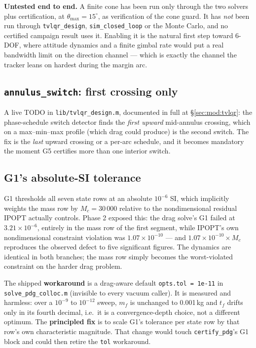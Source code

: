\documentclass[11pt]{article}
\newcommand{\file}[1]{\texttt{#1}}
\begin{document}
\textbf{Untested end to end.} A finite cone has been run only through the
two solvers plus certification, at $\theta_{\max}=15^\circ$, as verification
of the cone guard. It has \emph{not} been run through
\texttt{tvlqr\_design}, \texttt{sim\_closed\_loop} or the Monte Carlo, and
no certified campaign result uses it. Enabling it is the natural first step
toward 6-DOF, where attitude dynamics and a finite gimbal rate would put a
real bandwidth limit on the direction channel --- which is exactly the
channel the tracker leans on hardest during the margin arc.

\subsection{\texttt{annulus\_switch}: first crossing only}

A live TODO in \file{lib/tvlqr\_design.m}, documented in full at
\S\ref{sec:mod:tvlqr}: the phase-schedule switch detector finds the
\emph{first upward} mid-annulus crossing, which on a max--min--max profile
(which drag could produce) is the second switch. The fix is the \emph{last}
upward crossing or a per-arc schedule, and it becomes mandatory the moment
G5 certifies more than one interior switch.

\subsection{G1's absolute-SI tolerance}
\label{sec:extend:g1tol}

G1 thresholds all seven state rows at an absolute $10^{-6}$ SI, which
implicitly weights the mass row by $M_c = 30\,000$ relative to the
nondimensional residual IPOPT actually controls. Phase 2 exposed this: the
drag solve's G1 failed at $3.21\times10^{-6}$, entirely in the mass row of
the first segment, while IPOPT's own nondimensional constraint violation was
$1.07\times10^{-10}$ --- and $1.07\times10^{-10}\times M_c$ reproduces the
observed defect to five significant figures. The dynamics are identical in
both branches; the mass row simply becomes the worst-violated constraint on
the harder drag problem.

The shipped \textbf{workaround} is a drag-aware default
\texttt{opts.tol = 1e-11} in \file{solve\_pdg\_colloc.m} (invisible to every
vacuum caller). It is measured and harmless: over a $10^{-9}$ to $10^{-12}$
sweep, $m_f$ is unchanged to 0.001\,kg and $t_f$ drifts only in its fourth
decimal, i.e.\ it is a convergence-depth choice, not a different optimum.
The \textbf{principled fix} is to scale G1's tolerance per state row by that
row's own characteristic magnitude. That change would touch
\texttt{certify\_pdg}'s G1 block and could then retire the \texttt{tol}
workaround.
\end{document}
